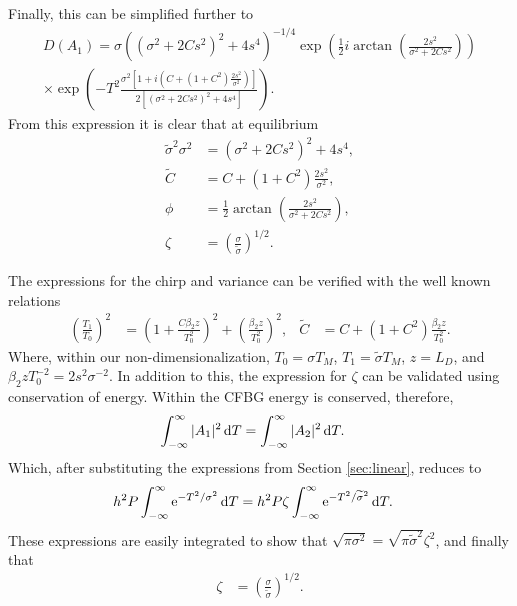 Finally, this can be simplified further to
\begin{multline*}
D(A_1) = \sigma \left( \left( \sigma^2 + 2C s^2 \right)^2 + 4s^4 \right)^{-1/4} \exp \left( \frac{1}{2} i \arctan \left( \frac{2s^2}{\sigma^2 + 2C s^2} \right) \right) \\
\times \exp \left( -T^2 \frac{\sigma^2 \left[ 1 + i \left( C + (1 + C^2) \frac{2s^2}{\sigma^2} \right) \right]}{2 \left[ (\sigma^2 + 2C s^2)^2 + 4s^4 \right]} \right).
\end{multline*}
From this expression it is clear that at equilibrium
\begin{align*}
\widetilde{\sigma}^2 \sigma^2 &= \left( \sigma^2 + 2 C s^2 \right)^2 + 4s^4, \\
\widetilde{C} &= C + (1+C^2) \frac{2 s^2}{\sigma^2}, \\
\phi &= \frac{1}{2} \arctan \left( \frac{2s^2}{\sigma^2 + 2C s^2} \right), \\
\zeta &= \left( \frac{\sigma}{\widetilde{\sigma}} \right)^{1/2}.
\end{align*}

The expressions for the chirp and variance can be verified with the well known relations \cite{agrawal2013, anderson, ferreira, silfvast}
\begin{align*}
\left( \frac{T_1}{T_0} \right)^2 &= \left( 1 + \frac{C \beta_2 z}{T_0^2} \right)^2 + \left( \frac{ \beta_2 z}{T_0^2} \right)^2,&
\widetilde{C} &= C + (1+C^2) \frac{\beta_2 z}{T_0^2}.
\end{align*}
Where, within our non-dimensionalization, $T_0 = \sigma T_M$, $T_1 = \widetilde{\sigma} T_M$, $z = L_D$, and $\beta_2 z T_0^{-2} = 2s^2\sigma^{-2}$. In addition to this, the expression for $\zeta$ can be validated using conservation of energy. Within the CFBG energy is conserved, therefore,
\begin{align*}
\int_{-\infty}^\infty |A_1|^2 \, \textrm{d} T &= \int_{-\infty}^\infty |A_2|^2 \, \textrm{d} T.
\end{align*}
Which, after substituting the expressions from Section \ref{sec:linear}, reduces to
\begin{align*}
h^2 P \int_{-\infty}^\infty \textrm{e}^{-T^2/\sigma^2} \, \textrm{d} T &= h^2 P \zeta \int_{-\infty}^\infty \textrm{e}^{-T^2/\widetilde{\sigma}^2} \, \textrm{d} T.
\end{align*}
These expressions are easily integrated to show that $\sqrt{\pi \sigma^2} = \sqrt{\pi \widetilde{\sigma}^2} \zeta^2$, and finally that
\begin{align*}
\zeta &= \left( \frac{\sigma}{\widetilde{\sigma}} \right)^{1/2}.
\end{align*}






